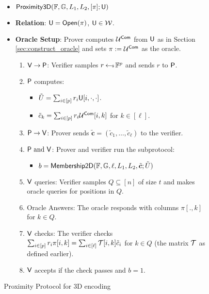 \begin{figure}[h!]
\begin{framed}
\begin{itemize}
\item {$\mathsf{Proximity3D}(\mathbb{F},\mathbb{G},L_1,L_2,[\pi];\mathsf{U})$}
\item {\bf Relation}: $\mathsf{U}=\mathsf{Open}(\pi)$, $\mathsf{U}\in \mathcal{W}$.
\item {\bf Oracle Setup}: Prover computes $\mathcal{U}^{\mathsf{Com}}$ from $\mathsf{U}$ as in
Section \ref{sec:construct_oracle} and sets
$\pi := \mathcal{U}^{\mathsf{Com}}$ as the oracle.
\begin{enumerate}[{1.}]
\item $\mathsf{V}\rightarrow \mathsf{P}$: Verifier samples $r\hskip2.3pt{\gets\!\!\mbox{\tiny${\$}$\normalsize}}\, \mathbb{F}^p$ and
sends $r$ to $\mathsf{P}$.
\item $\mathsf{P}$ computes: 
	\begin{itemize}
	\item $\tilde{U}=\sum_{i\in [p]}r_i\mathsf{U}[i,\cdot,\cdot]$.
	\item $\tilde{c}_k = \sum_{i\in [p]}r_i\mathcal{U}^{\mathsf{Com}}[i,k]$ for $k\in [\ell]$.
	\end{itemize}
\item $\mathsf{P}\rightarrow \mathsf{V}$: Prover sends
$\tilde{\bm{c}}=(\tilde{c}_1,\ldots,\tilde{c}_\ell)$ to the verifier.
\item $\mathsf{P} \text{ and } \mathsf{V}$: Prover and verifier run the subprotocol:
	\begin{itemize}
	\item $b=\mathsf{Membership2D}(\mathbb{F},\mathbb{G},\ell,L_1,L_2,\tilde{\bm{c}};\tilde{U})$
	\end{itemize}
\item $\mathsf{V}$ queries: Verifier samples $Q\subseteq [n]$ of size
$t$ and makes oracle queries for positions in $Q$.
\item Oracle Answers: The oracle responds with columns $\pi[.,k]$ for
$k\in Q$.
\item $\mathsf{V}$ checks: The verifier checks $\sum_{i\in
[p]}r_i\pi[i,k]=\sum_{i\in [\ell]}\mathcal{T}[i,k]\tilde{c}_i$ for $k\in Q$ (the matrix $\mathcal{T}$ as defined earlier).
\item $\mathsf{V}$ accepts if the check passes and $b=1$.
\end{enumerate}
\end{itemize}
\end{framed}
\caption{Proximity Protocol for 3D encoding}
\label{fig:prox3d}
\end{figure}


